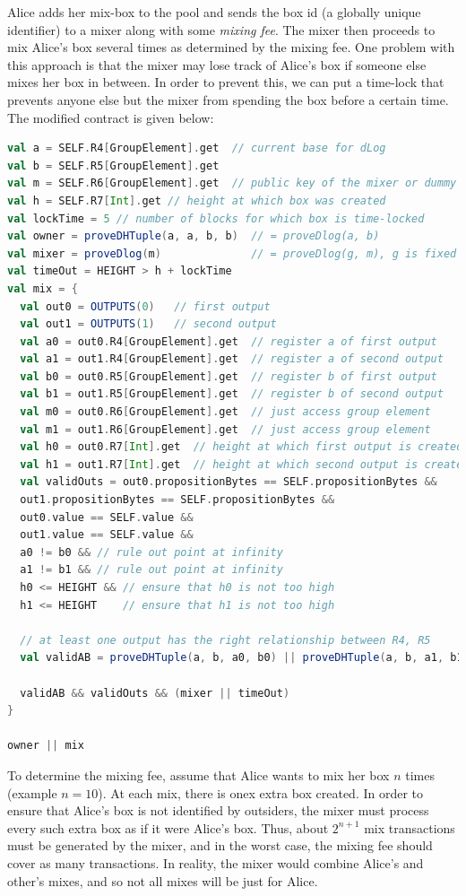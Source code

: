 \documentclass[runningheads]{llncs}
\begin{document}
Alice adds her mix-box to the pool and sends the box id (a globally unique identifier) to a mixer along with some {\em mixing fee}. The mixer then proceeds to mix Alice's box several times as determined by the mixing fee.
One problem with this approach is that the mixer may lose track of Alice's box if someone else mixes her box in between. In order to prevent this, we can put a time-lock that prevents anyone else but the mixer from spending the box before a certain time. The modified contract is given below:

\begin{lstlisting}[language=Scala,caption={Mix-script with Outsourceability},label=mixScript]
val a = SELF.R4[GroupElement].get  // current base for dLog
val b = SELF.R5[GroupElement].get
val m = SELF.R6[GroupElement].get  // public key of the mixer or dummy value
val h = SELF.R7[Int].get // height at which box was created
val lockTime = 5 // number of blocks for which box is time-locked
val owner = proveDHTuple(a, a, b, b)  // = proveDlog(a, b)
val mixer = proveDlog(m)              // = proveDlog(g, m), g is fixed
val timeOut = HEIGHT > h + lockTime
val mix = {
  val out0 = OUTPUTS(0)   // first output
  val out1 = OUTPUTS(1)   // second output
  val a0 = out0.R4[GroupElement].get  // register a of first output
  val a1 = out1.R4[GroupElement].get  // register a of second output
  val b0 = out0.R5[GroupElement].get  // register b of first output
  val b1 = out1.R5[GroupElement].get  // register b of second output
  val m0 = out0.R6[GroupElement].get  // just access group element
  val m1 = out1.R6[GroupElement].get  // just access group element
  val h0 = out0.R7[Int].get  // height at which first output is created
  val h1 = out1.R7[Int].get  // height at which second output is created
  val validOuts = out0.propositionBytes == SELF.propositionBytes &&
  out1.propositionBytes == SELF.propositionBytes &&
  out0.value == SELF.value &&
  out1.value == SELF.value &&
  a0 != b0 && // rule out point at infinity
  a1 != b1 && // rule out point at infinity
  h0 <= HEIGHT && // ensure that h0 is not too high
  h1 <= HEIGHT    // ensure that h1 is not too high

  // at least one output has the right relationship between R4, R5
  val validAB = proveDHTuple(a, b, a0, b0) || proveDHTuple(a, b, a1, b1)

  validAB && validOuts && (mixer || timeOut)
}

owner || mix
\end{lstlisting}

To determine the mixing fee, assume that Alice wants to mix her box $n$ times (example $n = 10$). At each mix, there is onex extra box created. In order to ensure that Alice's box is not identified by outsiders, the mixer must process every such extra box as if it were Alice's box. Thus, about $2^{n+1}$ mix transactions must be generated by the mixer, and in the worst case, the mixing fee should cover as many transactions. In reality, the mixer would combine Alice's and other's mixes, and so not all mixes will be just for Alice.
\end{document}
